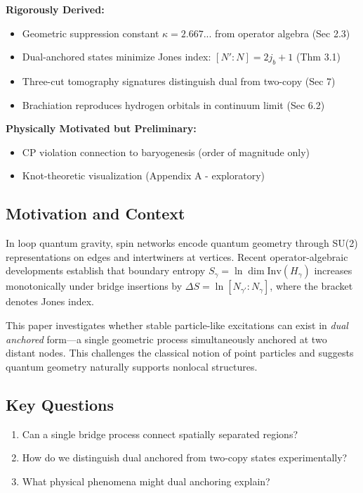 \documentclass[11pt]{article}
\newcommand{\Inv}{\mathrm{Inv}}
\theoremstyle{plain}
\theoremstyle{definition}
\begin{document}
\begin{tcolorbox}[title=Main Results Established in This Paper]
  \textbf{Rigorously Derived:}
  \begin{itemize}
    \item Geometric suppression constant $\kappa = 2.667...$ from operator algebra (Sec 2.3)
    \item Dual-anchored states minimize Jones index: $[N':N] = 2j_b+1$ (Thm 3.1)
    \item Three-cut tomography signatures distinguish dual from two-copy (Sec 7)
    \item Brachiation reproduces hydrogen orbitals in continuum limit (Sec 6.2)
  \end{itemize}

  \textbf{Physically Motivated but Preliminary:}
  \begin{itemize}
    \item CP violation connection to baryogenesis (order of magnitude only)
    \item Knot-theoretic visualization (Appendix A - exploratory)
  \end{itemize}
\end{tcolorbox}

\subsection{Motivation and Context}
In loop quantum gravity, spin networks encode quantum geometry through SU(2) representations on edges and intertwiners at vertices. Recent operator-algebraic developments \cite{bridge-monotonicity,operator-theory} establish that boundary entropy $S_\gamma = \ln\dim\Inv(H_\gamma)$ increases monotonically under bridge insertions by $\Delta S = \ln[N_{\gamma'}:N_\gamma]$, where the bracket denotes Jones index.

This paper investigates whether stable particle-like excitations can exist in \emph{dual anchored} form—a single geometric process simultaneously anchored at two distant nodes. This challenges the classical notion of point particles and suggests quantum geometry naturally supports nonlocal structures.

\subsection{Key Questions}
\begin{enumerate}
  \item Can a single bridge process connect spatially separated regions?
  \item How do we distinguish dual anchored from two-copy states experimentally?
  \item What physical phenomena might dual anchoring explain?
\end{enumerate}
\end{document}
